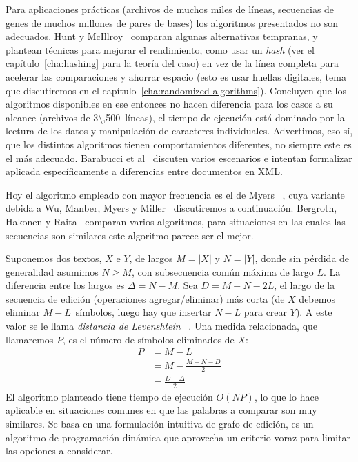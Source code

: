   Para aplicaciones prácticas
  (archivos de muchos miles de líneas,
   secuencias de genes de muchos millones de pares de bases)
  los algoritmos presentados no son adecuados.
  Hunt y McIllroy~%
    \cite{hunt76:_algor_differ_file_compar}
  comparan algunas alternativas tempranas,
  y plantean técnicas para mejorar el rendimiento,
  como usar un \emph{\foreignlanguage{english}{hash}}
  (ver el capítulo~\ref{cha:hashing} para la teoría del caso)
  en vez de la línea completa para acelerar las comparaciones y ahorrar espacio
  (esto es usar huellas digitales,
   tema que discutiremos en el capítulo~\ref{cha:randomized-algorithms}).
  Concluyen que los algoritmos disponibles en ese entonces
  no hacen diferencia para los casos a su alcance
  (archivos de \num{3\,500}~líneas),
  el tiempo de ejecución está dominado por la lectura de los datos
  y manipulación de caracteres individuales.
  Advertimos,
  eso sí,
  que los distintos algoritmos tienen comportamientos diferentes,
  no siempre este es el más adecuado.
  Barabucci et al~%
    \cite{barabucci16:_measur_qualit_diff_algor}
  discuten varios escenarios e intentan formalizar 
  aplicada específicamente a diferencias entre documentos en XML.

  Hoy el algoritmo empleado con mayor frecuencia
  es el de Myers~%
    \cite{myers86:_O_n_d_differ_algor_its_variat},
  cuya variante debida a Wu, Manber, Myers y Miller~%
    \cite{wu90:_sequence_comparison_algorithm}
  discutiremos a continuación.
  Bergroth, Hakonen y Raita~%
    \cite{bergroth00:_survey_longes_common_subseq_algor}
  comparan varios algoritmos,
  para situaciones en las cuales las secuencias son similares
  este algoritmo parece ser el mejor.

  Suponemos dos textos,
  \(X\) e \(Y\),
  de largos \(M = \lvert X \rvert\)
  y \(N = \lvert Y \rvert\),
  donde sin pérdida de generalidad asumimos \(N \ge M\),
  con subsecuencia común máxima de largo \(L\).
  La diferencia entre los largos es \(\Delta = N - M\).
  Sea \(D = M + N - 2 L\),
  el largo de la secuencia de edición
  (operaciones agregar/eliminar)
  más corta
  (de \(X\) debemos eliminar \(M - L\)~símbolos,
   luego hay que insertar \(N - L\) para crear \(Y\)).
  A este valor se le llama \emph{distancia de Levenshtein}~%
    \cite{levenshtein66:_binar_codes_capab_correc_delet_inser_rever}.
  Una medida relacionada,
  que llamaremos \(P\),
  es el número de símbolos eliminados de \(X\):
  \begin{align*}
    P
      &= M - L \\
      &= M - \frac{M + N - D}{2} \\
      &= \frac{D - \Delta}{2}
  \end{align*}
  El algoritmo planteado tiene tiempo de ejecución \(O(N P)\),
  lo que lo hace aplicable
  en situaciones comunes en que las palabras a comparar
  son muy similares.
  Se basa en una formulación intuitiva de grafo de edición,
  es un algoritmo de programación dinámica
  que aprovecha un criterio voraz para limitar las opciones a considerar.

